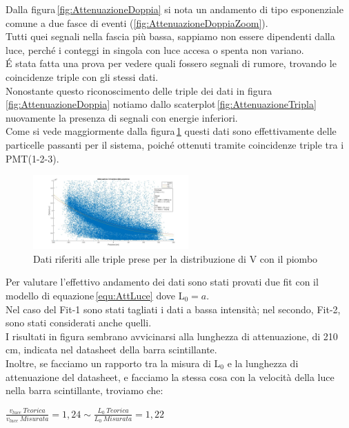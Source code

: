 \documentclass[a4paper,twocolumn]{article}
\begin{document}
Dalla figura\,\ref{fig:AttenuazioneDoppia} si nota un andamento di tipo esponenziale comune a due fasce di eventi (\ref{fig:AttenuazioneDoppiaZoom}).\\
Tutti quei segnali nella fascia più bassa, sappiamo non essere dipendenti dalla luce, perché i conteggi in singola con luce accesa o spenta non variano.\\
\'E stata fatta una prova per vedere quali fossero segnali di rumore, trovando le coincidenze triple con gli stessi dati.\\
Nonostante questo riconoscimento delle triple dei dati in figura\,\ref{fig:AttenuazioneDoppia} notiamo dallo scaterplot\,\ref{fig:AttenuazioneTripla} nuovamente la presenza di segnali con energie inferiori.\\
Come si vede maggiormente dalla figura\,\ref{fig:AttenuazioneTriplaFitta} questi dati sono effettivamente delle particelle passanti per il sistema, poiché ottenuti tramite coincidenze triple tra i PMT(1-2-3).

\begin{figure}[H]
\flushleft
\includegraphics[width=0.53\textwidth]{./immagini/TimeOfFlight/AttenuazioneMatlab.jpg}
\caption{Dati riferiti alle triple prese per la distribuzione di V con il piombo}
\label{fig:AttenuazioneTriplaFitta}
\end{figure}

Per valutare l'effettivo andamento dei dati sono stati provati due fit con il modello di equazione\,\ref{equ:AttLuce} dove L$_0 = a$.\\
Nel caso del Fit-1 sono stati tagliati i dati a bassa intensità; nel secondo, Fit-2, sono stati considerati anche quelli.\\
I risultati in figura sembrano avvicinarsi alla lunghezza di attenuazione, di 210\,cm, indicata nel datasheet della barra scintillante.\\
Inoltre, se facciamo un rapporto tra la misura di L$_0$ e la lunghezza di attenuazione del datasheet, e facciamo la stessa cosa con la velocità della luce nella barra scintillante, troviamo che:

\begin{center}
$\frac{v_{luce}\:Teorica}{v_{luce}\:Misurata} = 1,24 \sim \frac{L_0\:Teorica}{L_0\:Misurata} = 1,22$
\end{center}
\end{document}
